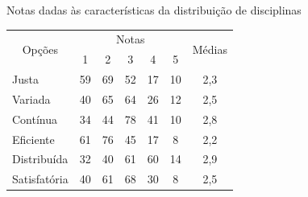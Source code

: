 \begin{apendicesenv}
  \begin{CenteredTable} \caption{Notas dadas às características da distribuição de disciplinas} \label{table:6.0-Opiniao}
    \begin{tabular}{| l | c c c c c | c |}
      \hline
      \multicolumn{1}{|c|}{\multirow{2}{*}{Opções}} &
      \multicolumn{5}{c|}{Notas}                    &
      \multicolumn{1}{c|}{\multirow{2}{*}{Médias}}
      \\
      \multicolumn{1}{|c|}{}                        &
      \multicolumn{1}{c|}{1}                        &
      \multicolumn{1}{c|}{2}                        &
      \multicolumn{1}{c|}{3}                        &
      \multicolumn{1}{c|}{4}                        &
      \multicolumn{1}{c|}{5}                        &
      \multicolumn{1}{c|}{}                                                        \\
      \hline
      Justa                                         & 59 & 69 & 52 & 17 & 10 & 2,3 \\
      Variada                                       & 40 & 65 & 64 & 26 & 12 & 2,5 \\
      Contínua                                      & 34 & 44 & 78 & 41 & 10 & 2,8 \\
      Eficiente                                     & 61 & 76 & 45 & 17 & 8  & 2,2 \\
      Distribuída                                   & 32 & 40 & 61 & 60 & 14 & 2,9 \\
      Satisfatória                                  & 40 & 61 & 68 & 30 & 8  & 2,5 \\
      \hline
    \end{tabular}
  \end{CenteredTable}

\end{apendicesenv}
